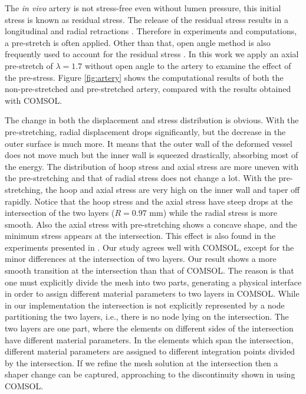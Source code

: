 The \emph{in vivo} artery is not stress-free even without lumen pressure, this initial stress is known as residual stress. The release of the residual stress results in a longitudinal and radial retractions \cite{Fung4, Holzapfel3}. Therefore in experiments and computations, a pre-stretch is often applied. Other than that, open angle method is also frequently used to account for the residual stress \cite{Kassab, Finet}. In this work we apply an axial pre-stretch of $\lambda = 1.7$ without open angle to the artery to examine the effect of the pre-stress. Figure \ref{fig:artery} shows the computational results of both the non-pre-stretched and pre-stretched artery, compared with the results obtained with COMSOL. 

The change in both the displacement and stress distribution is obvious. With the pre-stretching, radial displacement drops significantly, but the decrease in the outer surface is much more. It means that the outer wall of the deformed vessel does not move much but the inner wall is squeezed drastically, absorbing most of the energy. The distribution of hoop stress and axial stress are more uneven with the pre-stretching and that of radial stress does not change a lot. With the pre-stretching, the hoop and axial stress are very high on the inner wall and taper off rapidly. Notice that the hoop stress and the axial stress have steep drops at the intersection of the two layers ($R = 0.97$ mm) while the radial stress is more smooth. Also the axial stress with pre-stretching shows a concave shape, and the minimum stress appears at the intersection. This effect is also found in the experiments presented in \cite{Keitzer}. Our study agrees well with COMSOL, except for the minor differences at the intersection of two layers. Our result shows a more smooth transition at the intersection than that of COMSOL. The reason is that one must explicitly divide the mesh into two parts, generating a physical interface in order to assign different material parameters to two layers in COMSOL. While in our implementation the intersection is not explicitly represented by a node partitioning the two layers, i.e., there is no node lying on the intersection. The two layers are one part, where the elements on different sides of the intersection have different material parameters. In the elements which span the intersection, different material parameters are assigned to different integration points divided by the intersection. If we refine the mesh solution at the intersection then a shaper change can be captured, approaching to the discontinuity shown in using COMSOL.

